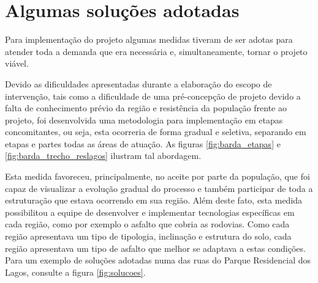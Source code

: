 	\section{Algumas soluções adotadas}

	Para implementação do projeto algumas medidas tiveram de ser adotas para atender toda a demanda que era necessária e, simultaneamente, tornar o projeto viável.
	
	Devido as dificuldades apresentadas durante a elaboração do escopo de intervenção, tais como a dificuldade de uma pré-concepção de projeto devido a falta de conhecimento prévio da região e resistência da população frente ao projeto, foi desenvolvida uma metodologia para implementação em etapas concomitantes, ou seja, esta ocorreria de forma gradual e seletiva, separando em etapas e partes todas as áreas de atuação. As figuras \ref{fig:barda_etapas} e \ref{fig:barda_trecho_reslagos} ilustram tal abordagem.
	
	Esta medida favoreceu, principalmente, no aceite por parte da população, que foi capaz de visualizar a evolução gradual do processo e também participar de toda a estruturação que estava ocorrendo em sua região. Além deste fato, esta medida possibilitou a equipe de desenvolver e implementar tecnologias específicas em cada região, como por exemplo o asfalto que cobria as rodovias. Como cada região apresentava um tipo de tipologia, inclinação e estrutura do solo, cada região apresentava um tipo de asfalto que melhor se adaptava a estas condições. Para um exemplo de soluções adotadas numa das ruas do Parque Residencial dos Lagos, consulte a figura \ref{fig:solucoes}.

